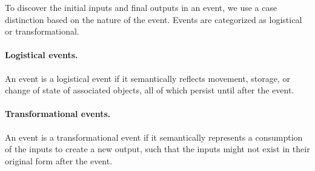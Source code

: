 To discover the initial inputs and final outputs in an event, we use a case distinction based on the nature of the event.
Events are categorized as logistical or transformational.


\paragraph{Logistical events.}
An event is a logistical event if it semantically reflects movement, storage, or change of state of associated objects, all of which persist until after the event.

\paragraph{Transformational events.}
An event is a transformational event if it semantically represents a consumption of the inputs to create a new output, such that the inputs might not exist in their original form after the event.

